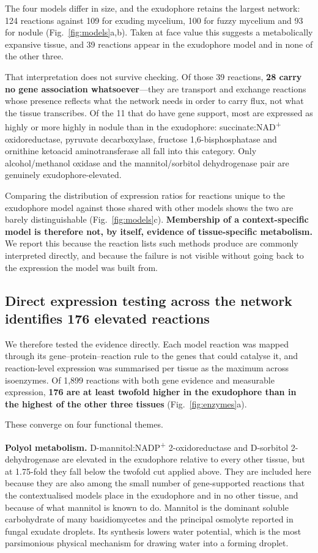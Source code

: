 The four models differ in size, and the exudophore retains the largest network: 124 reactions
against 109 for exuding mycelium, 100 for fuzzy mycelium and 93 for nodule
(Fig.~\ref{fig:models}a,b). Taken at face value this suggests a metabolically expansive
tissue, and 39 reactions appear in the exudophore model and in none of the other three.

That interpretation does not survive checking. Of those 39 reactions, \textbf{28 carry no gene
association whatsoever}---they are transport and exchange reactions whose presence reflects
what the network needs in order to carry flux, not what the tissue transcribes. Of the 11 that
do have gene support, most are expressed as highly or more highly in nodule than in the
exudophore: succinate:NAD\textsuperscript{+} oxidoreductase, pyruvate decarboxylase, fructose
1,6-bisphosphatase and ornithine ketoacid aminotransferase all fall into this category. Only
alcohol/methanol oxidase and the mannitol/sorbitol dehydrogenase pair are genuinely
exudophore-elevated.

Comparing the distribution of expression ratios for reactions unique to the exudophore model
against those shared with other models shows the two are barely distinguishable
(Fig.~\ref{fig:models}c). \textbf{Membership of a context-specific model is therefore not, by
itself, evidence of tissue-specific metabolism.} We report this because the reaction lists
such methods produce are commonly interpreted directly, and because the failure is not visible
without going back to the expression the model was built from.

\subsection{Direct expression testing across the network identifies 176 elevated reactions}

We therefore tested the evidence directly. Each model reaction was mapped through its
gene--protein--reaction rule to the genes that could catalyse it, and reaction-level expression
was summarised per tissue as the maximum across isoenzymes. Of 1,899 reactions with both gene
evidence and measurable expression, \textbf{176 are at least twofold higher in the exudophore
than in the highest of the other three tissues} (Fig.~\ref{fig:enzymes}a).

These converge on four functional themes.

\textbf{Polyol metabolism.} D-mannitol:NADP\textsuperscript{+} 2-oxidoreductase and D-sorbitol
2-dehydrogenase are elevated in the exudophore relative to every other tissue, but at
1.75-fold they fall below the twofold cut applied above. They are included here because they
are also among the small number of gene-supported reactions that the contextualised models
place in the exudophore and in no other tissue, and because of what mannitol is known to do. Mannitol is the
dominant soluble carbohydrate of many basidiomycetes and the principal osmolyte reported in
fungal exudate droplets. Its synthesis lowers water potential, which is the most parsimonious
physical mechanism for drawing water into a forming droplet.

